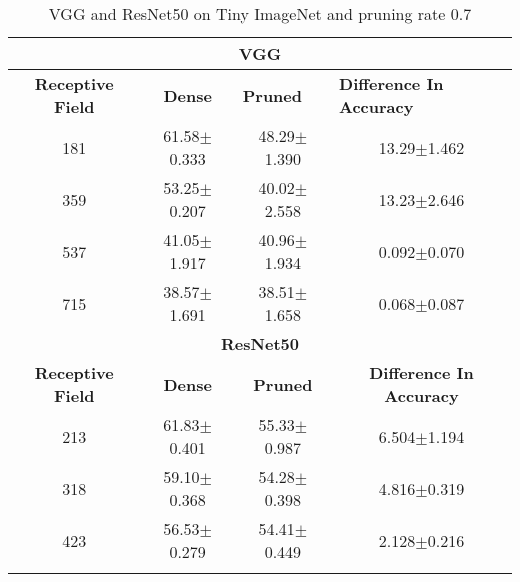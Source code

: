 \begin{table}[H]
  \centering
\begin{tabular}{@{}cccc@{}}
\toprule
\multicolumn{4}{c}{\textbf{VGG}}                                                                                                                                  \\ \midrule
\textbf{Receptive Field} & \textbf{Dense} & \multicolumn{1}{l}{\textbf{Pruned}} & \multicolumn{1}{l}{\textbf{Difference In Accuracy}} \\ \midrule
181                      & 61.58$\pm$0.333              & 48.29$\pm$1.390                                   & 13.29$\pm$1.462                                     \\
359                      & 53.25$\pm$0.207              & 40.02$\pm$2.558                                   & 13.23$\pm$2.646                                     \\
537                      & 41.05$\pm$1.917              & 40.96$\pm$1.934                                   & 0.092$\pm$0.070                                     \\
715                      & 38.57$\pm$1.691              & 38.51$\pm$1.658                                   & 0.068$\pm$0.087                                     \\ \midrule
\multicolumn{4}{c}{\textbf{ResNet50}}                                                                                                                             \\ \midrule
\textbf{Receptive Field} & \textbf{Dense} & \textbf{Pruned}                     & \textbf{Difference In Accuracy}                     \\
213                      & 61.83$\pm$0.401              & 55.33$\pm$0.987                                   & 6.504$\pm$1.194                                     \\
318                      & 59.10$\pm$0.368              & 54.28$\pm$0.398                                   & 4.816$\pm$0.319                                     \\
423                      & 56.53$\pm$0.279              & 54.41$\pm$0.449                                   &
2.128$\pm$0.216                                     \\ \bottomrule \\
\end{tabular}
\caption{VGG and ResNet50 on Tiny ImageNet and pruning rate 0.7}
\label{tab:tiny imagenet pruning rate07}
\end{table}

